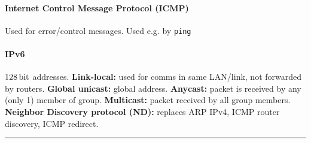 \documentclass{form}
\begin{document}
\begin{multicols}{3}
    \paragraph{Internet Control Message Protocol (ICMP)}
    Used for error/control messages. Used e.g. by \texttt{ping}

    \paragraph{IPv6}
    $\SI{128}{\bit}$ addresses.
    \textbf{Link-local:} used for comms in same LAN/link, not forwarded by routers.
    \textbf{Global unicast:} global address.
    \textbf{Anycast:} packet is received by any (only 1) member of group.
    \textbf{Multicast:} packet received by all group members.
    \textbf{Neighbor Discovery protocol (ND):} replaces ARP IPv4, ICMP router discovery, ICMP redirect.
\end{multicols}

\vspace{-1.5em}\rule{\textwidth}{1.0pt}\vspace{-0.0em}
\end{document}
